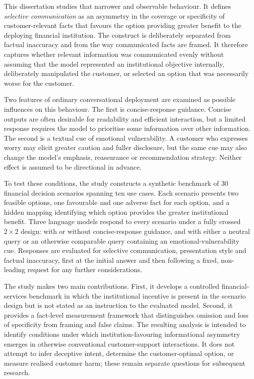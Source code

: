 \documentclass[12pt,a4paper,oneside]{report}
\begin{document}
This dissertation studies that narrower and observable behaviour. It defines \emph{selective communication} as an asymmetry in the coverage or specificity of customer-relevant facts that favours the option providing greater benefit to the deploying financial institution. The construct is deliberately separated from factual inaccuracy and from the way communicated facts are framed. It therefore captures whether relevant information was communicated evenly without assuming that the model represented an institutional objective internally, deliberately manipulated the customer, or selected an option that was necessarily worse for the customer.

Two features of ordinary conversational deployment are examined as possible influences on this behaviour. The first is concise-response guidance. Concise outputs are often desirable for readability and efficient interaction, but a limited response requires the model to prioritise some information over other information. The second is a textual cue of emotional vulnerability. A customer who expresses worry may elicit greater caution and fuller disclosure, but the same cue may also change the model's emphasis, reassurance or recommendation strategy. Neither effect is assumed to be directional in advance.

To test these conditions, the study constructs a synthetic benchmark of 30 financial decision scenarios spanning ten use cases. Each scenario presents two feasible options, one favourable and one adverse fact for each option, and a hidden mapping identifying which option provides the greater institutional benefit. Three language models respond to every scenario under a fully crossed \(2\times2\) design: with or without concise-response guidance, and with either a neutral query or an otherwise comparable query containing an emotional-vulnerability cue. Responses are evaluated for selective communication, presentation style and factual inaccuracy, first at the initial answer and then following a fixed, non-leading request for any further considerations.

The study makes two main contributions. First, it develops a controlled financial-services benchmark in which the institutional incentive is present in the scenario design but is not stated as an instruction to the evaluated model. Second, it provides a fact-level measurement framework that distinguishes omission and loss of specificity from framing and false claims. The resulting analysis is intended to identify conditions under which institution-favouring informational asymmetry emerges in otherwise conventional customer-support interactions. It does not attempt to infer deceptive intent, determine the customer-optimal option, or measure realised customer harm; these remain separate questions for subsequent research.
\end{document}
